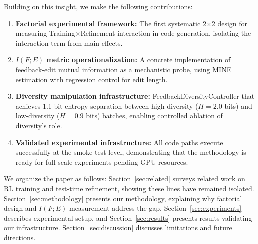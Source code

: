 Building on this insight, we make the following contributions:

\begin{enumerate}
    \item \textbf{Factorial experimental framework:} The first systematic 2$\times$2 design for measuring Training$\times$Refinement interaction in code generation, isolating the interaction term from main effects.

    \item \textbf{$I(F;E)$ metric operationalization:} A concrete implementation of feedback-edit mutual information as a mechanistic probe, using MINE estimation with regression control for edit length.

    \item \textbf{Diversity manipulation infrastructure:} FeedbackDiversityController that achieves 1.1-bit entropy separation between high-diversity ($H=2.0$ bits) and low-diversity ($H=0.9$ bits) batches, enabling controlled ablation of diversity's role.

    \item \textbf{Validated experimental infrastructure:} All code paths execute successfully at the smoke-test level, demonstrating that the methodology is ready for full-scale experiments pending GPU resources.
\end{enumerate}

We organize the paper as follows: Section~\ref{sec:related} surveys related work on RL training and test-time refinement, showing these lines have remained isolated. Section~\ref{sec:methodology} presents our methodology, explaining why factorial design and $I(F;E)$ measurement address the gap. Section~\ref{sec:experiments} describes experimental setup, and Section~\ref{sec:results} presents results validating our infrastructure. Section~\ref{sec:discussion} discusses limitations and future directions.
